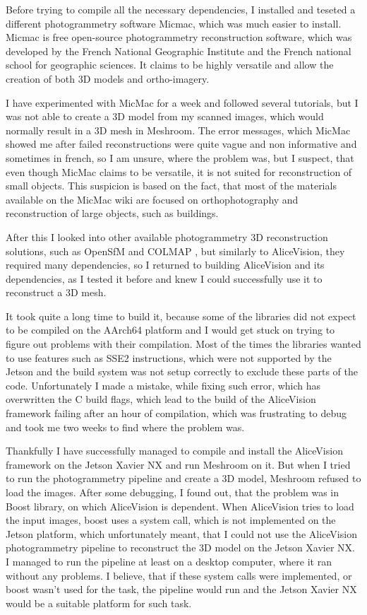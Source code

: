 Before trying to compile all the necessary dependencies, I installed and teseted a different photogrammetry software Micmac, which was much easier to install.
Micmac is free open-source photogrammetry reconstruction software, which was developed by the French National Geographic Institute and the French national school for geographic sciences. \cite{micmac_2017}
It claims to be highly versatile and allow the creation of both 3D models and ortho-imagery.

I have experimented with MicMac for a week and followed several tutorials, but I was not able to create a 3D model from my scanned images, which would normally result in a 3D mesh in Meshroom.
The error messages, which MicMac showed me after failed reconstructions were quite vague and non informative and sometimes in french, so I am unsure, where the problem was, but I suspect, that even though MicMac claims to be versatile, it is not suited for reconstruction of small objects.
This suspicion is based on the fact, that most of the materials available on the MicMac wiki are focused on orthophotography and reconstruction of large objects, such as buildings.


After this I looked into other available photogrammetry 3D reconstruction solutions, such as OpenSfM \cite{opensfm} and COLMAP \cite{schoenberger2016sfm, schoenberger2016mvs}, but similarly to AliceVision, they required many dependencies, so I returned to building AliceVision and its dependencies, as I tested it before and knew I could successfully use it to reconstruct a 3D mesh.

It took quite a long time to build it, because some of the libraries did not expect to be compiled on the AArch64 platform and I would get stuck on trying to figure out  problems with their compilation.
Most of the times the libraries wanted to use features such as SSE2 instructions, which were not supported by the Jetson and the build system was not setup correctly to exclude these parts of the code.
Unfortunately I made a mistake, while fixing such error, which has overwritten the C build flags, which lead to the build of the AliceVision framework failing after an hour of compilation, which was frustrating to debug and took me two weeks to find where the problem was.

Thankfully I have successfully managed to compile and install the AliceVision framework on the Jetson Xavier NX and run Meshroom on it.
But when I tried to run the photogrammetry pipeline and create a 3D model, Meshroom refused to load the images.
After some debugging, I found out, that the problem was in Boost library, on which AliceVision is dependent.
When AliceVision tries to load the input images, boost uses a system call, which is not implemented on the Jetson platform, which unfortunately meant, that I could not use the AliceVision photogrammetry pipeline to reconstruct the 3D model on the Jetson Xavier NX.
I managed to run the pipeline at least on a desktop computer, where it ran without any problems.
I believe, that if these system calls were implemented, or boost wasn't used for the task, the pipeline would run and the Jetson Xavier NX would be a suitable platform for such task.

